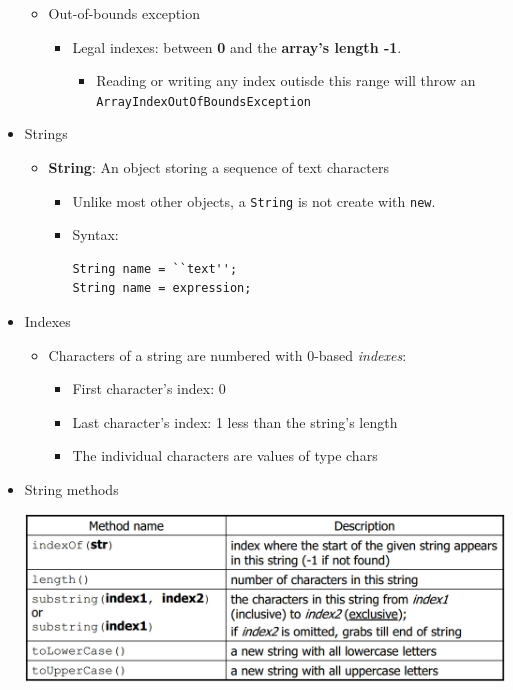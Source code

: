 \documentclass[a4paper]{article}
\newcommand{\inline}[1]{\lstinline!#1!}%
\begin{document}
\begin{itemize}
\begin{itemize}
      \item Out-of-bounds exception
        \begin{itemize}
        \item Legal indexes: between \textbf{0} and the \textbf{array's length -1}.
          \begin{itemize}
            \item Reading or writing any index outisde this range will throw an \inline{ArrayIndexOutOfBoundsException}
          \end{itemize}
        \end{itemize}
  \end{itemize}
  \item Strings
    \begin{itemize}
      \item \textbf{String}: An object storing a sequence of text characters
        \begin{itemize}
          \item Unlike most other objects, a \inline{String} is not create with \inline{new}.
          \item Syntax:
\begin{lstlisting}
String name = ``text'';
String name = expression;
\end{lstlisting} 
        \end{itemize}
    \end{itemize}
    \item Indexes
    \begin{itemize}
      \item Characters of a string are numbered with 0-based \textit{indexes}:
      \begin{itemize}
        \item First character's index: 0
        \item Last character's index: 1 less than the string's length
        \item The individual characters are values of type chars
      \end{itemize}
      \end{itemize}
      \item String methods\\
      \begin{center}
        \includegraphics[scale=1]{Figures/StringMethods.jpg} 

\end{center}
\end{itemize}
\end{document}

